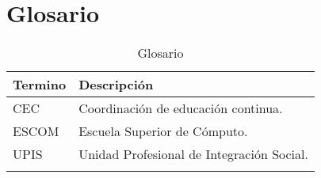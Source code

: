 \newpage
\section{Glosario}


\begin{longtable}{|p{5cm}|p{11cm}|}%
		\hline
			\textbf{Termino} & \textbf{Descripción}\\ %
		\hline\hline %
			{CEC} & {Coordinación de educación continua.}\\		
		\hline
			{ESCOM} & {Escuela Superior de Cómputo.}\\		
		\hline
			{UPIS} & {Unidad Profesional de Integración Social.}\\		
		\hline
\caption{Glosario}
\end{longtable}
